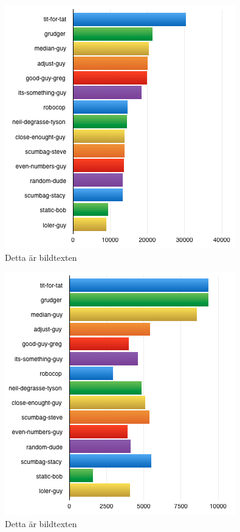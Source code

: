 \begin{figure}[htb]
	\begin{center}
	\includegraphics[scale=0.75, angle=0]{bilder/points.png}
	\caption{Detta är bildtexten}
	\label{points}
	\end{center}
\end{figure}

\begin{figure}[htb]
	\begin{center}
	\includegraphics[scale=0.75, angle=0]{bilder/wins.png}
	\caption{Detta är bildtexten}
	\label{wins}
	\end{center}
\end{figure}

